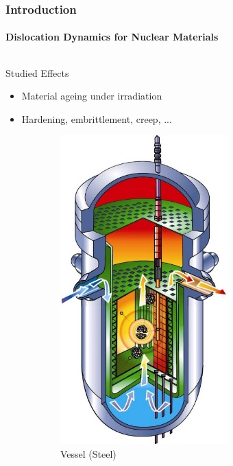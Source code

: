 \documentclass[aspectratio=1610,t,10pt]{beamer}
\newlength{\freeheight}
\begin{document}
\begin{frame}
    \frametitle{Introduction}
    \framesubtitle{Dislocation Dynamics for Nuclear Materials}
    \begin{columns}[c]
	    \begin{column}{.48\textwidth}
	        
	        	\begin{block}{Studied Effects}
	        		\begin{itemize}
	        			\item Material ageing under irradiation
	        			\item Hardening, embrittlement, creep, ...
	        		\end{itemize}
	        	\end{block}
	       
	        \begin{figure}
	            \centering
	            \begin{subfigure}[t]{0.38\textwidth}
	                \centering
	                \includegraphics[height=0.5\freeheight, keepaspectratio]{img/vessel}
	                \caption{Vessel (Steel) }
	            \end{subfigure}
	            \begin{subfigure}[t]{0.58\textwidth}
	                \centering

\end{subfigure}
\end{figure}
\end{column}
\end{columns}
\end{frame}
\end{document}

